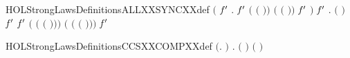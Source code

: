 \newcommand{\HOLStrongLawsDate}{27 October 2021}
\newcommand{\HOLStrongLawsTime}{11:41}
\begin{SaveVerbatim}{HOLStrongLawsDefinitionsALLXXSYNCXXdef}
\HOLTokenTurnstile{} \ensuremath{(}\HOLSymConst{\HOLTokenForall{}} \ensuremath{\HOLBoundVar{f}\sp{\prime{}}} .
         \ensuremath{\HOLBoundVar{f}\sp{\prime{}}}  \HOLSymConst{\ensuremath{=}}
       \ensuremath{(} \ensuremath{(} \ensuremath{)}\ensuremath{)} \ensuremath{(} \ensuremath{(} \ensuremath{)}\ensuremath{)} \ensuremath{\HOLBoundVar{f}\sp{\prime{}}} \ensuremath{)} \HOLSymConst{\HOLTokenConj{}}
   \HOLSymConst{\HOLTokenForall{}}  \ensuremath{\HOLBoundVar{f}\sp{\prime{}}} .
       \ensuremath{(} \ensuremath{)} \ensuremath{\HOLBoundVar{f}\sp{\prime{}}}  \HOLSymConst{\ensuremath{=}}
        \ensuremath{\HOLBoundVar{f}\sp{\prime{}}}  \HOLSymConst{\ensuremath{+}}
      \ensuremath{(} \ensuremath{(} \ensuremath{(} \ensuremath{)}\ensuremath{)}\ensuremath{)} \ensuremath{(} \ensuremath{(} \ensuremath{(} \ensuremath{)}\ensuremath{)}\ensuremath{)} \ensuremath{\HOLBoundVar{f}\sp{\prime{}}} 
\end{SaveVerbatim}
\newcommand{\HOLStrongLawsDefinitionsALLXXSYNCXXdef}{\UseVerbatim{HOLStrongLawsDefinitionsALLXXSYNCXXdef}}
\begin{SaveVerbatim}{HOLStrongLawsDefinitionsCCSXXCOMPXXdef}
\HOLTokenTurnstile{} \ensuremath{(}\HOLSymConst{\HOLTokenForall{}}.    \HOLSymConst{\ensuremath{=}}  \ensuremath{)} \HOLSymConst{\HOLTokenConj{}} \HOLSymConst{\HOLTokenForall{}} .   \ensuremath{(} \ensuremath{)} \HOLSymConst{\ensuremath{=}}    \HOLSymConst{\ensuremath{\mid}}  \ensuremath{(} \ensuremath{)}
\end{SaveVerbatim}
\newcommand{\HOLStrongLawsDefinitionsCCSXXCOMPXXdef}{\UseVerbatim{HOLStrongLawsDefinitionsCCSXXCOMPXXdef}}
